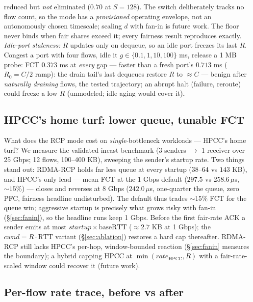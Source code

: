 \documentclass[conference]{IEEEtran}
\newcommand{\hpccfs}{\textsc{RDMA-RCP}\xspace}
\begin{document}
reduced but \emph{not} eliminated ($0.70$ at $S{=}128$). The switch deliberately tracks no
flow count, so the mode has a \emph{provisioned} operating envelope, not an autonomously
chosen timescale; scaling $d$ with fan-in is future work.
The floor never binds when fair shares exceed it; every fairness result reproduces exactly.
\emph{Idle-port staleness:} $R$ updates only on dequeue, so an idle port freezes its last
$R$. Congest a port with four flows, idle it $g \in \{0.1, 1, 10, 100\}$ ms, release a 1 MB
probe: FCT $0.373$ ms at \emph{every} gap --- faster than a fresh port's $0.713$ ms
($R_0{=}C/2$ ramp): the drain tail's last dequeues restore $R$ to ${\approx}C$ --- benign
after \emph{naturally draining} flows, the tested trajectory; an abrupt halt (failure,
reroute) could freeze a low $R$ (unmodeled; idle aging would cover it).

\subsection{HPCC's home turf: lower queue, tunable FCT}
\label{sec:cost}

What does the RCP mode cost on \emph{single}-bottleneck workloads --- HPCC's home turf? We
measure the validated incast benchmark (3 senders $\to$ 1 receiver over 25 Gbps; 12 flows,
100--400 KB), sweeping the sender's startup rate. Two things stand out: \hpccfs holds far less queue at every
startup ($38$--$64$ vs $143$ KB), and HPCC's only lead --- mean FCT at the 1 Gbps default
($297.5$ vs $258.6\,\mu$s, ${\sim}15\%$) --- closes and reverses at 8 Gbps
($242.0\,\mu$s, one-quarter the queue, zero PFC, fairness headline undisturbed). The
default thus trades ${\sim}15\%$ FCT for the queue win; aggressive startup is precisely
what grows risky with fan-in (\S\ref{sec:fanin}), so the headline runs keep 1 Gbps. Before the first fair-rate ACK a sender
emits at most $\mathit{startup} \times \mathrm{baseRTT}$ (${\approx}2.7$ KB at 1 Gbps);
the $cwnd = R \cdot \mathrm{RTT}$ variant (\S\ref{sec:ablation}) restores a hard cap
thereafter. \hpccfs still lacks HPCC's per-hop,
window-bounded reaction (\S\ref{sec:fanin} measures the boundary); a hybrid capping HPCC at
$\min(\mathit{rate}_{\mathrm{HPCC}}, R)$ with a fair-rate-scaled window could recover it
(future work).

\subsection{Per-flow rate trace, before vs after}
\end{document}
